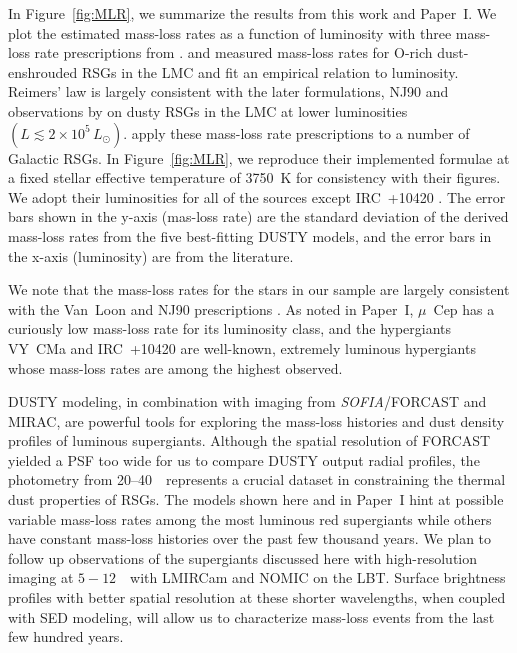 \documentclass[modern]{aastex61}
\newcommand{\SOFIA}{{\it SOFIA}}
\begin{document}
In Figure~\ref{fig:MLR}, we summarize the results from this work and Paper~I. We plot the estimated mass-loss rates as a function of luminosity with three mass-loss rate prescriptions from \cite{mauron2011}. \cite{reimers1975} and \cite{kudritzki1978} measured mass-loss rates for O-rich dust-enshrouded RSGs in the LMC and fit an empirical relation to luminosity. Reimers' law is largely consistent with the later formulations, NJ90 \citep{nieuwenhuijzen1990} and observations by \cite{vanloon2005} on dusty RSGs in the LMC at lower luminosities $\left(L\lesssim2\times10^5\,L_\odot\right)$. \cite{mauron2011} apply these mass-loss rate prescriptions to a number of Galactic RSGs. In Figure~\ref{fig:MLR}, we reproduce their implemented formulae at a fixed stellar effective temperature of 3750~K for consistency with their figures.  We adopt their luminosities for all of the sources except IRC~+10420 \citep[$\log{L/L_\odot}\approx5.7-5.8$,][]{debeck2010,tiffany2010}.  The error bars shown in the y-axis (mas-loss rate) are the standard deviation of the derived mass-loss rates from the five best-fitting DUSTY models, and the error bars in the x-axis (luminosity) are from the literature.

We note that the mass-loss rates for the stars in our sample are largely consistent with the Van~Loon and NJ90 prescriptions \citep[analytical forms given in][]{mauron2011}.  As noted in Paper~I, $\mu$~Cep has a curiously low mass-loss rate for its luminosity class, and the hypergiants VY~CMa and IRC~+10420 are well-known, extremely luminous hypergiants whose mass-loss rates are among the highest observed.

DUSTY modeling, in combination with imaging from \SOFIA/FORCAST and MIRAC, are powerful tools for exploring the mass-loss histories and dust density profiles of luminous supergiants.  Although the spatial resolution of FORCAST yielded a PSF too wide for us to compare DUSTY output radial profiles, the photometry from 20--40~\micron\ represents a crucial dataset in constraining the thermal dust properties of RSGs.  The models shown here and in Paper~I hint at possible variable mass-loss rates among the most luminous red supergiants while others have constant mass-loss histories over the past few thousand years. We plan to follow up observations of the supergiants discussed here with high-resolution imaging at $5-12$~\micron\ with LMIRCam and NOMIC on the LBT.  Surface brightness profiles with better spatial resolution at these shorter wavelengths, when coupled with SED modeling, will allow us to characterize mass-loss events from the last few hundred years.
\end{document}

